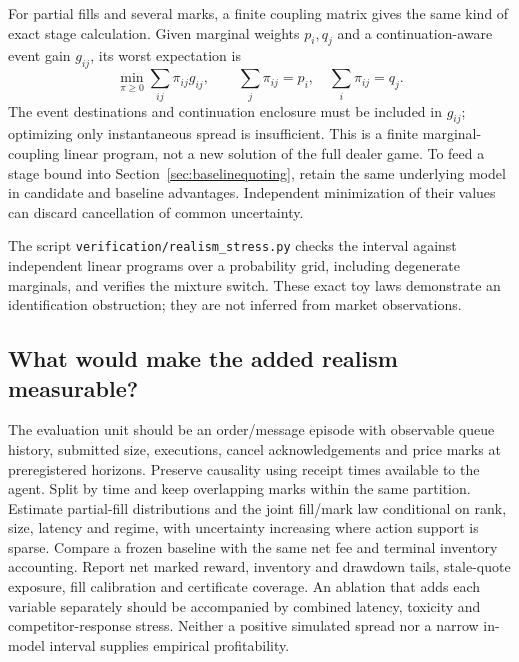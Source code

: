 For partial fills and several marks, a finite coupling matrix gives the
same kind of exact stage calculation. Given marginal weights \(p_i,q_j\)
and a continuation-aware event gain \(g_{ij}\), its worst expectation is
\begin{equation}\label{eq:marktransport}
 \min_{\pi\ge0}\sum_{ij}\pi_{ij}g_{ij},\qquad
 \sum_j\pi_{ij}=p_i,\quad \sum_i\pi_{ij}=q_j.
\end{equation}
The event destinations and continuation enclosure must be included in
\(g_{ij}\); optimizing only instantaneous spread is insufficient. This is
a finite marginal-coupling linear program, not a new solution of the
full dealer game. To feed a stage bound into
Section~\ref{sec:baselinequoting}, retain the same underlying model in
candidate and baseline advantages. Independent minimization of their
values can discard cancellation of common uncertainty.

The script \texttt{verification/realism\_stress.py} checks the interval
against independent linear programs over a probability grid, including
degenerate marginals, and verifies the mixture switch. These exact toy
laws demonstrate an identification obstruction; they are not inferred
from market observations.

\subsection{What would make the added realism measurable?}

The evaluation unit should be an order/message episode with observable
queue history, submitted size, executions, cancel acknowledgements and
price marks at preregistered horizons. Preserve causality using receipt
times available to the agent. Split by time and keep overlapping marks
within the same partition. Estimate partial-fill distributions and the
joint fill/mark law conditional on rank, size, latency and regime, with
uncertainty increasing where action support is sparse. Compare a frozen
baseline with the same net fee and terminal inventory accounting.
Report net marked reward, inventory and drawdown tails, stale-quote
exposure, fill calibration and certificate coverage. An ablation that
adds each variable separately should be accompanied by combined latency,
toxicity and competitor-response stress. Neither a positive simulated
spread nor a narrow in-model interval supplies empirical profitability.
